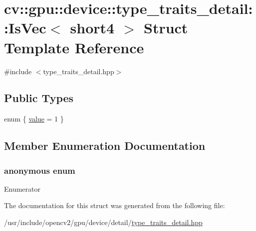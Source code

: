 \hypertarget{structcv_1_1gpu_1_1device_1_1type__traits__detail_1_1IsVec_3_01short4_01_4}{\section{cv\-:\-:gpu\-:\-:device\-:\-:type\-\_\-traits\-\_\-detail\-:\-:Is\-Vec$<$ short4 $>$ Struct Template Reference}
\label{structcv_1_1gpu_1_1device_1_1type__traits__detail_1_1IsVec_3_01short4_01_4}
}


{\ttfamily \#include $<$type\-\_\-traits\-\_\-detail.\-hpp$>$}

\subsection*{Public Types}
\begin{DoxyCompactItemize}
\item 
enum \{ \hyperlink{structcv_1_1gpu_1_1device_1_1type__traits__detail_1_1IsVec_3_01short4_01_4_a096360970eb3f879a427dc7cc89393e7a4ee30c0d6e6d70c0511af4968a5d0521}{value} = 1
 \}
\end{DoxyCompactItemize}


\subsection{Member Enumeration Documentation}
\hypertarget{structcv_1_1gpu_1_1device_1_1type__traits__detail_1_1IsVec_3_01short4_01_4_a096360970eb3f879a427dc7cc89393e7}{\subsubsection[{anonymous enum}]{\setlength{\rightskip}{0pt plus 5cm}anonymous enum}}\label{structcv_1_1gpu_1_1device_1_1type__traits__detail_1_1IsVec_3_01short4_01_4_a096360970eb3f879a427dc7cc89393e7}
\begin{Desc}
\item[Enumerator]\par
\begin{description}
\item[{\em 
\hypertarget{structcv_1_1gpu_1_1device_1_1type__traits__detail_1_1IsVec_3_01short4_01_4_a096360970eb3f879a427dc7cc89393e7a4ee30c0d6e6d70c0511af4968a5d0521}{value}\label{structcv_1_1gpu_1_1device_1_1type__traits__detail_1_1IsVec_3_01short4_01_4_a096360970eb3f879a427dc7cc89393e7a4ee30c0d6e6d70c0511af4968a5d0521}
}]\end{description}
\end{Desc}


The documentation for this struct was generated from the following file\-:\begin{DoxyCompactItemize}
\item 
/usr/include/opencv2/gpu/device/detail/\hyperlink{type__traits__detail_8hpp}{type\-\_\-traits\-\_\-detail.\-hpp}\end{DoxyCompactItemize}
